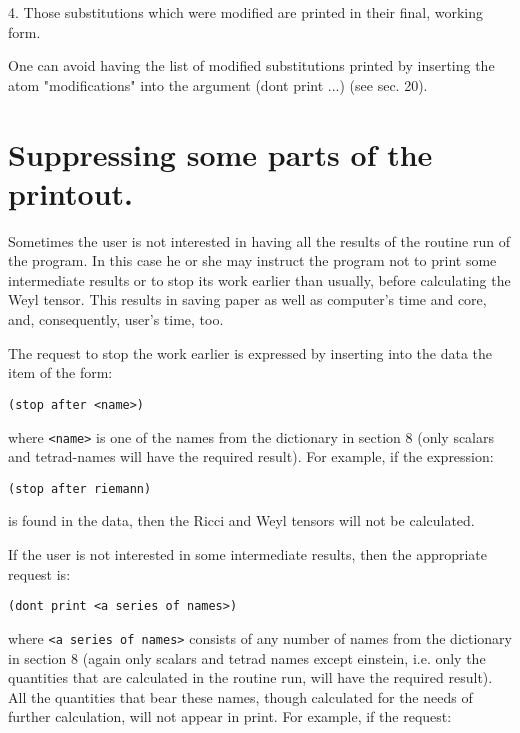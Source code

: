\bigskip

4. Those substitutions which were modified are  printed
     in their final, working form.

One can avoid having the list of modified substitutions printed  by  inserting
the atom "modifications" into the argument (dont print ...) (see sec. 20).

\section{Suppressing some parts of the printout.}

Sometimes the user is not interested in having all  the results  of  the
routine run of the program. In this case he or she may instruct the program not
to print some intermediate results or to stop its work earlier than usually,
before
     calculating the Weyl tensor. This results in saving paper as
     well  as computer's time and core, and, consequently, user's
     time, too.

The request to stop the work earlier  is  expressed  by
     inserting into the data the item of the form:

\bigskip

\begin{verbatim}
(stop after <name>)
\end{verbatim}

\bigskip

\noindent where \verb+<name>+ is one of the names from the dictionary in
section 8 (only scalars and tetrad-names will have the required
     result). For example, if the expression:

\bigskip

\begin{verbatim}
(stop after riemann)
\end{verbatim}

\bigskip

\noindent is found in the data, then the Ricci and Weyl  tensors  will
     not be calculated.

If the user is not interested in some intermediate  results, then the
appropriate request is:

\bigskip

\begin{verbatim}
(dont print <a series of names>)
\end{verbatim}

\bigskip

\noindent where \verb+<a series of names>+ consists of any  number  of  names
     from  the  dictionary  in  section 8 (again only scalars and
     tetrad names except einstein, i.e. only the quantities  that
     are  calculated  in  the routine run, will have the required
     result). All the quantities that bear  these  names,  though
     calculated  for  the  needs of further calculation, will not
     appear in print. For example, if the request:

